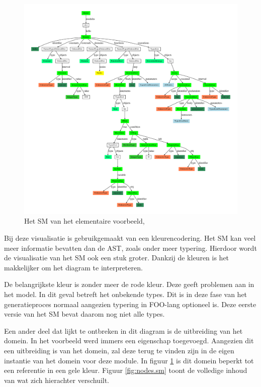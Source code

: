 \begin{figure}[ht]
  \centering
  \includegraphics[width=\linewidth]{resources/hello_sm.pdf}
  \caption{Het SM van het elementaire voorbeeld, }
  \label{fig:hello.sm}
\end{figure}

Bij deze visualisatie is gebruikgemaakt van een kleurencodering. Het SM kan
veel meer informatie bevatten dan de AST, zoals onder meer typering. Hierdoor
wordt de visualisatie van het SM ook een stuk groter. Dankzij de kleuren is het
makkelijker om het diagram te interpreteren.

De belangrijkste kleur is zonder meer de rode kleur. Deze geeft problemen aan
in het model. In dit geval betreft het onbekende types. Dit is in deze fase van
het generatieproces normaal aangezien typering in FOO-lang optioneel is. Deze
eerste versie van het SM bevat daarom nog niet alle types.

Een ander deel dat lijkt te ontbreken in dit diagram is de uitbreiding van het
domein. In het voorbeeld werd immers een eigenschap  toegevoegd.
Aangezien dit een uitbreiding is van het domein, zal deze terug te vinden zijn
in de eigen instantie van het domein voor deze module. In figuur
\ref{fig:hello.sm} is dit domein beperkt tot een referentie in een gele kleur.
Figuur \ref{fig:nodes.sm} toont de volledige inhoud van wat zich hierachter
verschuilt.

